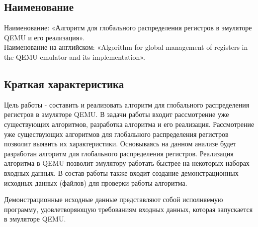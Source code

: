 \subsection{Наименование}
Наименование: «Алгоритм для глобального распределения регистров в эмуляторе QEMU и его реализация». \\
Наименование на английском: «Algorithm for global management of registers in the QEMU emulator and its implementation». \\


\subsection{Краткая характеристика}
    Цель работы - составить и реализовать алгоритм для глобального распределения регистров в эмуляторе QEMU.
    В задачи работы входит рассмотрение уже существующих алгоритмов, разработка алгоритма и его реализация.
    Рассмотрение уже существующих алгоритмов для глобального распределения регистров позволит выявить их характеристики. Основываясь на данном анализе будет разработан алгоритм для глобального распределения регистров. 
    Реализация алгоритма в QEMU позволит эмулятору работать быстрее на некоторых наборах входных данных.
    В состав работы также входит создание демонстрационных исходных данных (файлов) для проверки работы алгоритма.

\smallskip
Демонстрационные исходные данные представляют собой исполняемую программу, удовлетворяющую требованиям входных данных, которая запускается в эмуляторе QEMU.

